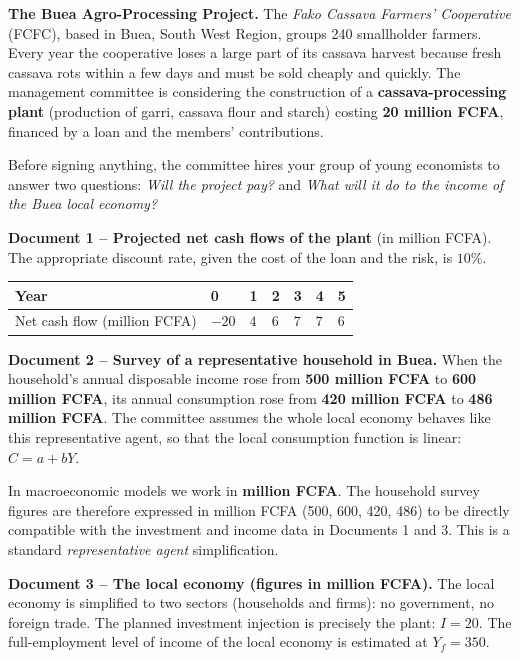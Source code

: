 \documentclass[11pt]{article}
\newcounter{popsec}
\newcounter{popsub}
\newcommand{\courssub}[1]{%
  \stepcounter{popsub}%
  \par\vspace{9pt}\noindent{\popxbold\fontsize{11.5}{13}\selectfont\color{popink}{\color{poporange}\thepopsec.\thepopsub}\hspace{6pt}#1}\par\nopagebreak\vspace{4pt}
}
\begin{document}
\courssub{Situation}

\textbf{The Buea Agro-Processing Project.} The \emph{Fako Cassava Farmers' Cooperative} (FCFC), based in Buea, South West Region, groups 240 smallholder farmers. Every year the cooperative loses a large part of its cassava harvest because fresh cassava rots within a few days and must be sold cheaply and quickly. The management committee is considering the construction of a \textbf{cassava-processing plant} (production of garri, cassava flour and starch) costing \textbf{20 million FCFA}, financed by a loan and the members' contributions.

Before signing anything, the committee hires your group of young economists to answer two questions: \emph{Will the project pay?} and \emph{What will it do to the income of the Buea local economy?}

\textbf{Document 1 -- Projected net cash flows of the plant} (in million FCFA). The appropriate discount rate, given the cost of the loan and the risk, is $10\%$.

\begin{center}
\begin{tabularx}{\linewidth}{|l|X|X|X|X|X|X|}
\hline
\rowcolor{popblueL} Year & 0 & 1 & 2 & 3 & 4 & 5 \\
\hline
Net cash flow (million FCFA) & $-20$ & $4$ & $6$ & $7$ & $7$ & $6$ \\
\hline
\end{tabularx}
\end{center}

\textbf{Document 2 -- Survey of a representative household in Buea.} When the household's annual disposable income rose from \textbf{500 million FCFA} to \textbf{600 million FCFA}, its annual consumption rose from \textbf{420 million FCFA} to \textbf{486 million FCFA}. The committee assumes the whole local economy behaves like this representative agent, so that the local consumption function is linear: $C = a + bY$.

\begin{attention}
In macroeconomic models we work in \textbf{million FCFA}. The household survey figures are therefore expressed in million FCFA (500, 600, 420, 486) to be directly compatible with the investment and income data in Documents 1 and 3. This is a standard \emph{representative agent} simplification.
\end{attention}

\textbf{Document 3 -- The local economy (figures in million FCFA).} The local economy is simplified to two sectors (households and firms): no government, no foreign trade. The planned investment injection is precisely the plant: $I = 20$. The full-employment level of income of the local economy is estimated at $Y_f = 350$.
\end{document}
